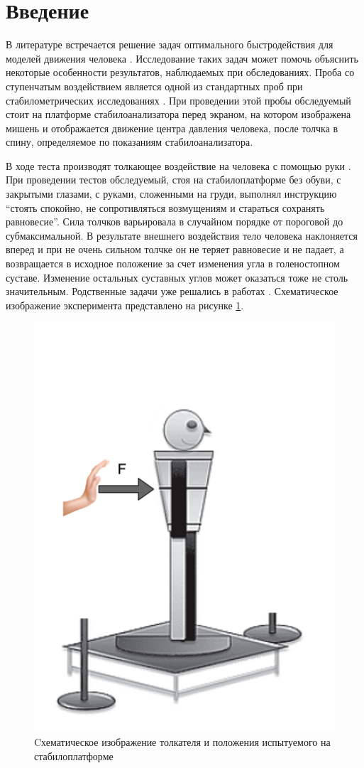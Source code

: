 \documentclass[a4paper,12pt, openany]{book}
\theoremstyle{plain} %
\theoremstyle{definition} %
\theoremstyle{remark} %
\numberwithin{equation}{chapter}
\begin{document}
\thispagestyle{empty} %
\normalsize{
\newpage

\tableofcontents

\newpage


\chapter*{Введение}
В литературе встречается решение задач оптимального быстродействия для моделей движения человека \cite{pandy,humanMovements}. Исследование таких задач может помочь объяснить некоторые особенности результатов, наблюдаемых при обследованиях.
Проба со ступенчатым воздействием является одной из стандартных проб
при стабилометрических исследованиях \cite{pusher,kozlovskay}. При проведении этой пробы
обследуемый стоит на платформе стабилоанализатора перед экраном, на
котором изображена мишень и отображается движение центра давления
человека, после толчка в спину, определяемое по показаниям стабилоанализатора.

В ходе теста производят толкающее воздействие на человека с помощью руки \cite{pusher}.
При проведении тестов обследуемый, стоя на стабилоплатформе без обуви,
с закрытыми глазами, с руками, сложенными на груди, выполнял инструкцию
“стоять спокойно, не сопротивляться возмущениям и стараться сохранять равновесие”.
Сила толчков варьировала в случайном порядке от пороговой до субмаксимальной. В результате внешнего
воздействия тело человека наклоняется вперед и при не очень сильном толчке
он не теряет равновесие и не падает, а возвращается в исходное
положение за счет изменения угла в голеностопном суставе. Изменение
остальных суставных углов может оказаться тоже не столь значительным.
Родственные задачи уже решались в работах \cite{PAKrychinin,kruchinMetoda}.
Схематическое изображение эксперимента представлено на рисунке \ref{fig:pusher}.
\begin{figure}[h!]
    \centering
    \includegraphics[width=0.35\linewidth]{human2.png}
    \caption{Cхематическое изображение толкателя и
        положения испытуемого на стабилоплатформе}
    \label{fig:pusher}
\end{figure}

}
\end{document}
